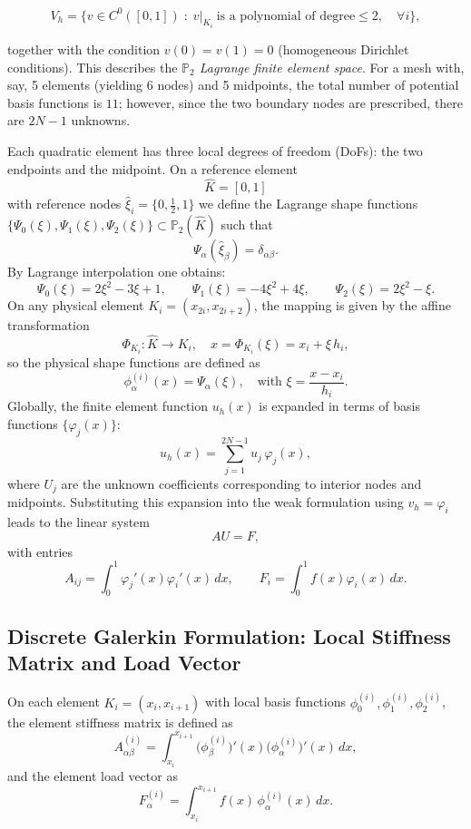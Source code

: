 \documentclass[a4paper,10pt]{article}
\begin{document}
\[
	V_h=\{v\in C^0([0,1])\;:\; v|_{K_i}\ \text{is a polynomial of degree}\le2,\quad\forall i\},
\]

together with the condition \(v(0)=v(1)=0\) (homogeneous Dirichlet conditions).
This describes the \emph{\(\mathbb{P}_2\) Lagrange finite element space}.
For a mesh with, say, 5 elements (yielding 6 nodes) and 5 midpoints, the total number of potential basis functions is \(11\);
however, since the two boundary nodes are prescribed, there are \(2N-1\) unknowns.

Each quadratic element has three local degrees of freedom (DoFs): the two endpoints and the midpoint.
On a reference element
\[
	\hat{K}=[0,1]
\]
with reference nodes \(\hat{\xi}_i=\{0,\tfrac{1}{2},1\}\) we define the Lagrange shape functions \(\{\Psi_0(\xi),\Psi_1(\xi),\Psi_2(\xi)\}\subset \mathbb{P}_2(\hat{K})\) such that
\[
	\Psi_\alpha(\hat{\xi}_\beta)=\delta_{\alpha\beta}.
\]
By Lagrange interpolation one obtains:
\[
	\Psi_0(\xi)=2\xi^2-3\xi+1,\qquad \Psi_1(\xi)=-4\xi^2+4\xi,\qquad \Psi_2(\xi)=2\xi^2-\xi.
\]
On any physical element \(K_i=(x_{2i},x_{2i+2})\), the mapping is given by the affine transformation
\[
	\Phi_{K_i}:\hat{K}\to K_i,\quad x=\Phi_{K_i}(\xi)=x_i+\xi\,h_i,
\]
so the physical shape functions are defined as
\[
	\phi_\alpha^{(i)}(x)=\Psi_\alpha(\xi),\quad \text{with } \xi=\frac{x-x_i}{h_i}.
\]
Globally, the finite element function \(u_h(x)\) is expanded in terms of basis functions \(\{\varphi_j(x)\}\):
\[
	u_h(x)=\sum_{j=1}^{2N-1} u_j\,\varphi_j(x),
\]
where \(U_j\) are the unknown coefficients corresponding to interior nodes and midpoints. Substituting this expansion into the weak formulation using \(v_h=\varphi_i\) leads to the linear system
\[
	AU=F,
\]
with entries
\[
	A_{ij}=\int_0^1\varphi_j'(x)\varphi_i'(x)\,dx,\qquad F_i=\int_0^1 f(x)\varphi_i(x)\,dx.
\]

\subsection{Discrete Galerkin Formulation: Local Stiffness Matrix and Load Vector}

On each element \(K_i=(x_i,x_{i+1})\) with local basis functions \(\phi_0^{(i)},\phi_1^{(i)},\phi_2^{(i)}\), the element stiffness matrix is defined as
\[
	A^{(i)}_{\alpha\beta}=\int_{x_i}^{x_{i+1}} \big(\phi_\beta^{(i)}\big)'(x) \big(\phi_\alpha^{(i)}\big)'(x)\,dx,
\]
and the element load vector as
\[
	F^{(i)}_\alpha=\int_{x_i}^{x_{i+1}} f(x)\,\phi_\alpha^{(i)}(x)\,dx.
\]
\end{document}
